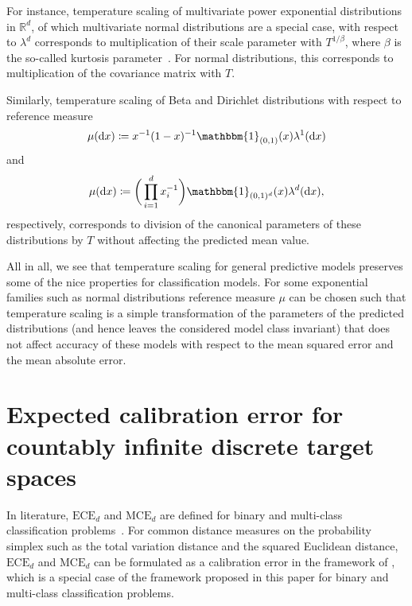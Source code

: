 \documentclass{article}
\begin{document}
For instance, temperature scaling of multivariate power exponential
distributions~\citep{Gomez1998} in $\mathbb{R}^d$,
of which multivariate normal distributions are a special case, with
respect to $\lambda^d$ corresponds to multiplication of their
scale parameter with $T^{1/\beta}$, where $\beta$ is the
so-called kurtosis parameter~\citep{GomezSanchezManzano2008}.
For normal distributions, this corresponds to multiplication
of the covariance matrix with $T$. 

Similarly, temperature scaling of Beta and Dirichlet distributions
with respect to reference measure
\begin{equation*}
    \mu(\mathrm{d}x) \coloneqq x^{-1} (1-x)^{-1} \mathbbm{1}_{(0,1)}(x) \lambda^1(\mathrm{d}x)
\end{equation*}
and
\begin{equation*}
    \mu(\mathrm{d}x) \coloneqq \bigg(\prod_{i=1}^d x_i^{-1}\bigg) \mathbbm{1}_{(0,1)^d}(x) \lambda^d(\mathrm{d}x),
\end{equation*}
respectively, corresponds to division of the canonical parameters of these
distributions by $T$ without affecting the predicted mean value.

All in all, we see that temperature scaling for general
predictive models preserves some of the nice properties for classification
models. For some exponential families such as normal
distributions reference measure $\mu$ can be chosen such that temperature
scaling is a simple transformation of the parameters of the predicted
distributions (and hence leaves the considered model class invariant) that
does not affect accuracy of these models with respect to the mean squared error
and the mean absolute error.

\section{Expected calibration error for countably infinite discrete target spaces}
\label{app:ece_infinite}

In literature, $\mathrm{ECE}_d$ and $\mathrm{MCE}_d$ are defined for binary and multi-class
classification problems~\citep{Vaicenavicius2019,Guo2017,Naeini2015}. For common distance measures
on the probability simplex such as the total variation distance and the squared Euclidean distance,
$\mathrm{ECE}_d$ and $\mathrm{MCE}_d$ can be formulated as a calibration error in the framework of
\citet{Widmann2019}, which is a special case of the framework proposed in this paper for binary and
multi-class classification problems.
\end{document}
